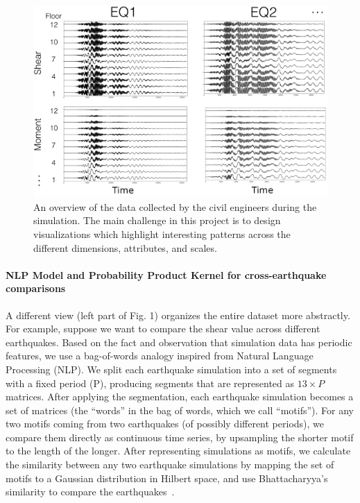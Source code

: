 \begin{figure}[h]
	\centering %
	\includegraphics[width=\columnwidth]{figs/structure} 
	\caption{An overview of the data collected by the civil engineers during the simulation. The main challenge in this project is to design visualizations which highlight interesting patterns across the different dimensions, attributes, and scales.}
	\label{fig:data}
\end{figure}


\paragraph*{NLP Model and Probability Product Kernel for cross-earthquake comparisons}
\label{sec:method}
A different view (left part of Fig. 1) organizes the entire dataset more abstractly. For example, suppose we want to compare the shear value across different earthquakes. Based on the fact and observation that simulation data has periodic features, we use a bag-of-words analogy inspired from Natural Language Processing (NLP). We split each earthquake simulation into a set of segments with a fixed period (P), producing segments that are represented as  $13 \times P$ matrices. After applying the segmentation, each earthquake simulation becomes a set of matrices (the ``words'' in the bag of words, which we call ``motifs''). For any two motifs coming from two earthquakes (of possibly different periods), we compare them directly as continuous time series, by upsampling the shorter motif to the length of the longer. After representing simulations as motifs, we calculate the similarity between any two earthquake simulations by mapping the set of motifs to a Gaussian distribution in Hilbert space, and use Bhattacharyya's similarity to compare the earthquakes~\cite{conf/icml/KondorJ03}.

